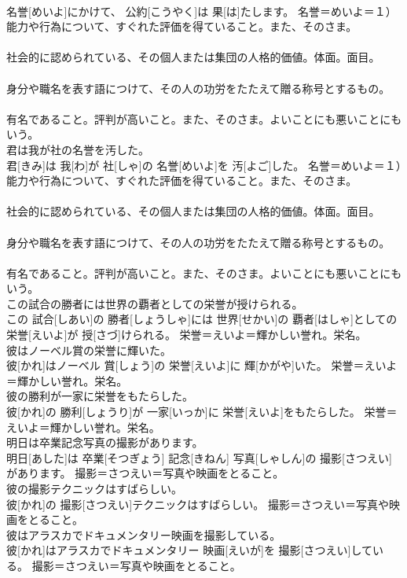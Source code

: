 \documentclass[8pt]{extreport}
\begin{document}
\begin{CJK}{UTF8}{min}
{\\	名誉[めいよ]にかけて、 公約[こうやく]は 果[は]たします。	名誉＝めいよ＝１）能力や行為について、すぐれた評価を得ていること。また、そのさま。 　　　　　　　
\\	社会的に認められている、その個人または集団の人格的価値。体面。面目。 　　　　　　　
\\	身分や職名を表す語につけて、その人の功労をたたえて贈る称号とするもの。 　　　　　　　
\\	有名であること。評判が高いこと。また、そのさま。よいことにも悪いことにもいう。
\\	君は我が社の名誉を汚した。	
\\	君[きみ]は 我[わ]が 社[しゃ]の 名誉[めいよ]を 汚[よご]した。	名誉＝めいよ＝１）能力や行為について、すぐれた評価を得ていること。また、そのさま。 　　　　　　　
\\	社会的に認められている、その個人または集団の人格的価値。体面。面目。 　　　　　　　
\\	身分や職名を表す語につけて、その人の功労をたたえて贈る称号とするもの。 　　　　　　　
\\	有名であること。評判が高いこと。また、そのさま。よいことにも悪いことにもいう。
\\	この試合の勝者には世界の覇者としての栄誉が授けられる。	
\\	この 試合[しあい]の 勝者[しょうしゃ]には 世界[せかい]の 覇者[はしゃ]としての 栄誉[えいよ]が 授[さづ]けられる。	栄誉＝えいよ＝輝かしい誉れ。栄名。
\\	彼はノーベル賞の栄誉に輝いた。	
\\	彼[かれ]はノーベル 賞[しょう]の 栄誉[えいよ]に 輝[かがや]いた。	栄誉＝えいよ＝輝かしい誉れ。栄名。
\\	彼の勝利が一家に栄誉をもたらした。	
\\	彼[かれ]の 勝利[しょうり]が 一家[いっか]に 栄誉[えいよ]をもたらした。	栄誉＝えいよ＝輝かしい誉れ。栄名。
\\	明日は卒業記念写真の撮影があります。	
\\	明日[あした]は 卒業[そつぎょう] 記念[きねん] 写真[しゃしん]の 撮影[さつえい]があります。	撮影＝さつえい＝写真や映画をとること。
\\	彼の撮影テクニックはすばらしい。	
\\	彼[かれ]の 撮影[さつえい]テクニックはすばらしい。	撮影＝さつえい＝写真や映画をとること。
\\	彼はアラスカでドキュメンタリー映画を撮影している。	
\\	彼[かれ]はアラスカでドキュメンタリー 映画[えいが]を 撮影[さつえい]している。	撮影＝さつえい＝写真や映画をとること。
}
\end{CJK}
\end{document}
